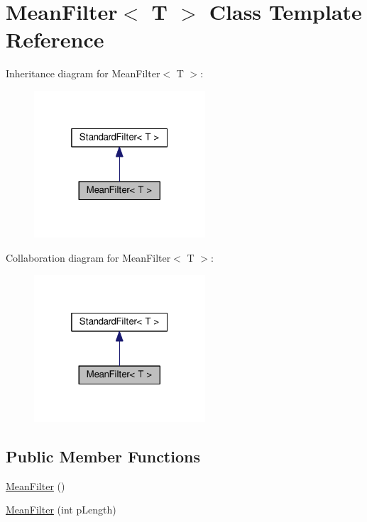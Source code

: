 \hypertarget{class_mean_filter}{}\section{Mean\+Filter$<$ T $>$ Class Template Reference}
\label{class_mean_filter}


Inheritance diagram for Mean\+Filter$<$ T $>$\+:\nopagebreak
\begin{figure}[H]
\begin{center}
\leavevmode
\includegraphics[width=181pt]{class_mean_filter__inherit__graph}
\end{center}
\end{figure}


Collaboration diagram for Mean\+Filter$<$ T $>$\+:\nopagebreak
\begin{figure}[H]
\begin{center}
\leavevmode
\includegraphics[width=181pt]{class_mean_filter__coll__graph}
\end{center}
\end{figure}
\subsection*{Public Member Functions}
\begin{DoxyCompactItemize}
\item 
\hyperlink{class_mean_filter_a413efd370b9feb8bb7bef736c83356ec}{Mean\+Filter} ()
\item 
\hyperlink{class_mean_filter_a6266059422f16d94fbd2661cb05ffade}{Mean\+Filter} (int p\+Length)
\end{DoxyCompactItemize}
